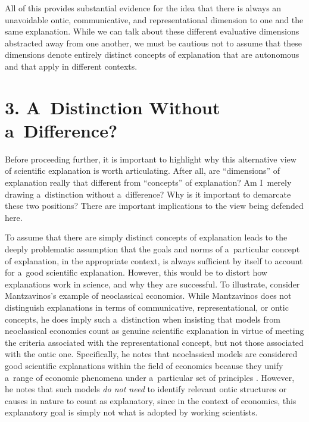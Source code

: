All of this provides substantial evidence for the idea that there is always an unavoidable ontic, communicative, and representational dimension to one and the same explanation. While we can talk about these different evaluative dimensions abstracted away from one another, we must be cautious not to assume that these dimensions denote entirely distinct concepts of explanation that are autonomous and that apply in different contexts.

\section*{3. A~Distinction Without a~Difference?}
Before proceeding further, it is important to highlight why this alternative view of scientific explanation is worth articulating. After all, are ``dimensions'' of explanation really that different from ``concepts'' of explanation? Am I~merely drawing a~distinction without a~difference? Why is it important to demarcate these two positions? There are important implications to the view being defended here.

To assume that there are simply distinct concepts of explanation leads to the deeply problematic assumption that the goals and norms of a~particular concept of explanation, in the appropriate context, is always sufficient by itself to account for a~good scientific explanation. However, this would be to distort how explanations work in science, and why they are successful. To illustrate, consider Mantzavinos's example of neoclassical economics. While Mantzavinos does not distinguish explanations in terms of communicative, representational, or ontic concepts, he does imply such a~distinction when insisting that models from neoclassical economics count as genuine scientific explanation in virtue of meeting the criteria associated with the representational concept, but not those associated with the ontic one. Specifically, he notes that neoclassical models are considered good scientific explanations within the field of economics because they unify a~range of economic phenomena under a~particular set of principles
\parencite[][p.12]{mantzavinos_explanatory_2016}. %
 However, he notes that such models \textit{do not need} to identify relevant ontic structures or causes in nature to count as explanatory, since in the context of economics, this explanatory goal is simply not what is adopted by working scientists.

